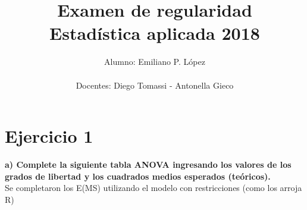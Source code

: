 \documentclass[11pt]{article}
\title{Examen de regularidad \\ Estadística aplicada 2018}
\author{Alumno: Emiliano P. López \\ \\ Docentes: Diego Tomassi - Antonella Gieco}
\begin{document}
    
    
    \maketitle
    
    \tableofcontents

    

    \hypertarget{ejercicio-1}{%
\section*{Ejercicio 1}\label{ejercicio-1}}

\textbf{a) Complete la siguiente tabla ANOVA ingresando los valores de
los grados de libertad y los cuadrados medios esperados (teóricos).}\\

Se completaron los E(MS) utilizando el modelo con restricciones (como
los arroja R)
\end{document}
